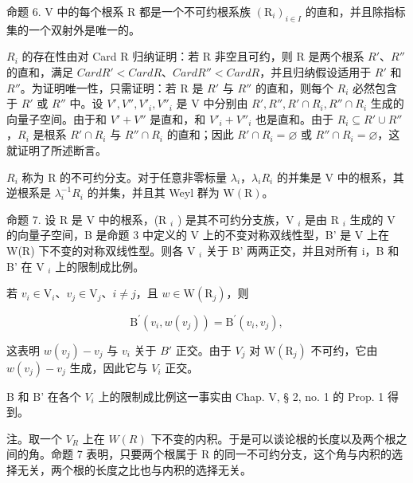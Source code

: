 命题 6. V 中的每个根系 R 都是一个不可约根系族 \((\mathrm{R}_{i})_{i\in I}\) 的直和，并且除指标集的一个双射外是唯一的。

\(R_{i}\) 的存在性由对 Card R 归纳证明：若 R 非空且可约，则 R 是两个根系 \(R'\)、\(R''\) 的直和，满足 \(Card R' < Card R\)、\(Card R'' < Card R\)，并且归纳假设适用于 \(R'\) 和 \(R''\)。为证明唯一性，只需证明：若 R 是 \(R'\) 与 \(R''\) 的直和，则每个 \(R_i\) 必然包含于 \(R'\) 或 \(R''\) 中。设 \(V', V'', V'_i, V''_i\) 是 V 中分别由 \(R', R'', R' \cap R_i, R'' \cap R_i\) 生成的向量子空间。由于和 \(V' + V''\) 是直和，和 \(V'_i + V''_i\) 也是直和。由于 \(R_i \subseteq R' \cup R''\)，\(R_i\) 是根系 \(R' \cap R_i\) 与 \(R'' \cap R_i\) 的直和；因此 \(R' \cap R_i = \varnothing\) 或 \(R'' \cap R_i = \varnothing\)，这就证明了所述断言。

\(R_{i}\) 称为 R 的不可约分支。对于任意非零标量 \(\lambda_{i}\)，\(\lambda_{i}R_{i}\) 的并集是 V 中的根系，其逆根系是 \(\lambda_{i}^{-1}R_{i}\) 的并集，并且其 Weyl 群为 \(\mathrm{W}(\mathrm{R})\)。

命题 7. 设 R 是 V 中的根系，(R \(_{i}\) ) 是其不可约分支族，V \(_{i}\) 是由 R \(_{i}\) 生成的 V 的向量子空间，B 是命题 3 中定义的 V 上的不变对称双线性型，B' 是 V 上在 W(R) 下不变的对称双线性型。则各 V \(_{i}\) 关于 B' 两两正交，并且对所有 i，B 和 B' 在 V \(_{i}\) 上的限制成比例。

若 \(v_{i} \in \mathrm{V}_{i}\)、\(v_{j} \in \mathrm{V}_{j}\)、\(i \neq j\)，且 \(w \in \mathrm{W}(\mathrm{R}_j)\)，则

\[
\mathrm{B} ^ {\prime} (v _ {i}, w (v _ {j})) = \mathrm{B} ^ {\prime} (v _ {i}, v _ {j}),
\]

这表明 \(w(v_{j}) - v_{j}\) 与 \(v_{i}\) 关于 \(B'\) 正交。由于 \(V_{j}\) 对 \(\mathrm{W}(\mathrm{R}_{j})\) 不可约，它由 \(w(v_{j}) - v_{j}\) 生成，因此它与 \(V_{i}\) 正交。

B 和 B' 在各个 \(V_{i}\) 上的限制成比例这一事实由 Chap. V, § 2, no. 1 的 Prop. 1 得到。

注。取一个 \(V_{R}\) 上在 \(W(R)\) 下不变的内积。于是可以谈论根的长度以及两个根之间的角。命题 7 表明，只要两个根属于 R 的同一不可约分支，这个角与内积的选择无关，两个根的长度之比也与内积的选择无关。


